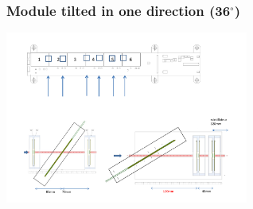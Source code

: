 \documentclass{beamer}
\newcommand{\degres}{\ensuremath{^\circ}}
\begin{document}
\begin{frame}
  \frametitle{Module tilted in one direction (36\degres)}

  \begin{center}
    \includegraphics[width = 0.6\textwidth]{Pictures/tb_cern_11_sketch_tilted.pdf}
  \end{center}
\end{frame}
\end{document}
